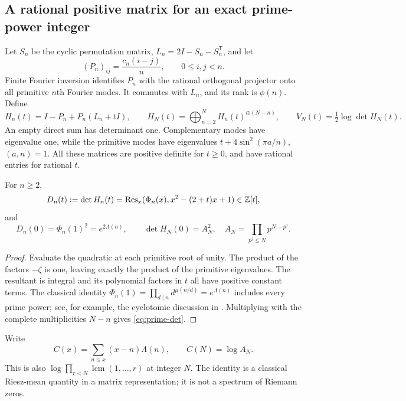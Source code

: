 \subsection{A rational positive matrix for an exact prime-power integer}
Let $S_n$ be the cyclic permutation matrix, $L_n=2I-S_n-S_n^{\mathsf T}$, and let
\[
 (P_n)_{ij}=\frac{c_n(i-j)}n,\qquad 0\le i,j<n.
\]
Finite Fourier inversion identifies $P_n$ with the rational orthogonal projector onto all primitive $n$th Fourier modes. It commutes with $L_n$, and its rank is $\phi(n)$. Define
\begin{equation}\label{eq:positive-matrix}
 H_n(t)=I-P_n+P_n(L_n+tI),\qquad
 H_N(t)=\bigoplus_{n=2}^N H_n(t)^{\oplus(N-n)},
 \qquad V_N(t)=\tfrac12\log\det H_N(t).
\end{equation}
An empty direct sum has determinant one. Complementary modes have eigenvalue one, while the primitive modes have eigenvalues
$t+4\sin^2(\pi a/n)$, $(a,n)=1$. All these matrices are positive definite for $t\ge0$, and have rational entries for rational $t$.

\begin{proposition}\label{prop:exact-det}
For $n\ge2$,
\[
 D_n(t):=\det H_n(t)
 =\operatorname{Res}_x(\Phi_n(x),x^2-(2+t)x+1)\in\mathbb Z[t],
\]
and
\begin{equation}\label{eq:prime-det}
 D_n(0)=\Phi_n(1)^2=e^{2\Lambda(n)},\qquad
 \det H_N(0)=A_N^2,
 \quad A_N=\prod_{p^j\le N}p^{N-p^j}.
\end{equation}
\end{proposition}
\begin{proof}
Evaluate the quadratic at each primitive root of unity. The product of the factors $-\zeta$ is one, leaving exactly the product of the primitive eigenvalues. The resultant is integral and its polynomial factors in $t$ all have positive constant terms. The classical identity
$\Phi_n(1)=\prod_{d\mid n}d^{\mu(n/d)}=e^{\Lambda(n)}$
includes every prime power; see, for example, the cyclotomic discussion in \cite{AK22}. Multiplying with the complete multiplicities $N-n$ gives \eqref{eq:prime-det}.
\end{proof}

Write
\[
 C(x)=\sum_{n\le x}(x-n)\Lambda(n),\qquad C(N)=\log A_N.
\]
This is also $\log\prod_{r<N}\operatorname{lcm}(1,\ldots,r)$ at integer $N$. The identity is a classical Riesz-mean quantity in a matrix representation; it is not a spectrum of Riemann zeros.

